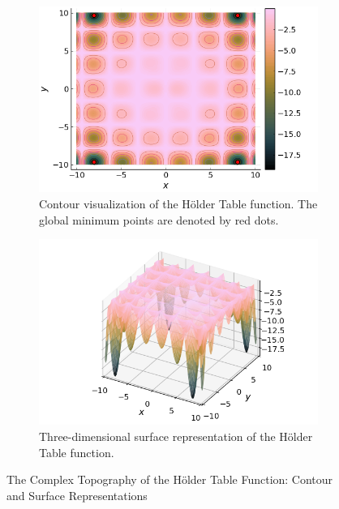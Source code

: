   \begin{figure}[ht!]
    \centering
    \begin{subfigure}[b]{0.45\textwidth}
      \centering
      \includegraphics[width=\textwidth]
        {img/test_functions/holder_table_contour.png}
      \caption{
        Contour visualization of the Hölder Table function.
        The global minimum points are denoted by red dots.
      }
      \label{fig:app:test:holder:contour}
    \end{subfigure}
    \hfill
    \begin{subfigure}[b]{0.45\textwidth}
      \centering
      \includegraphics[width=\textwidth]
        {img/test_functions/holder_table_surface.png}
      \caption{
        Three-dimensional surface representation of the Hölder Table function.
      }
      \label{fig:app:test:holder:surface}
    \end{subfigure}
    \caption{
      The Complex Topography of the Hölder Table Function: Contour and Surface
      Representations
    }
    \label{fig:app:test:holder}
  \end{figure}
